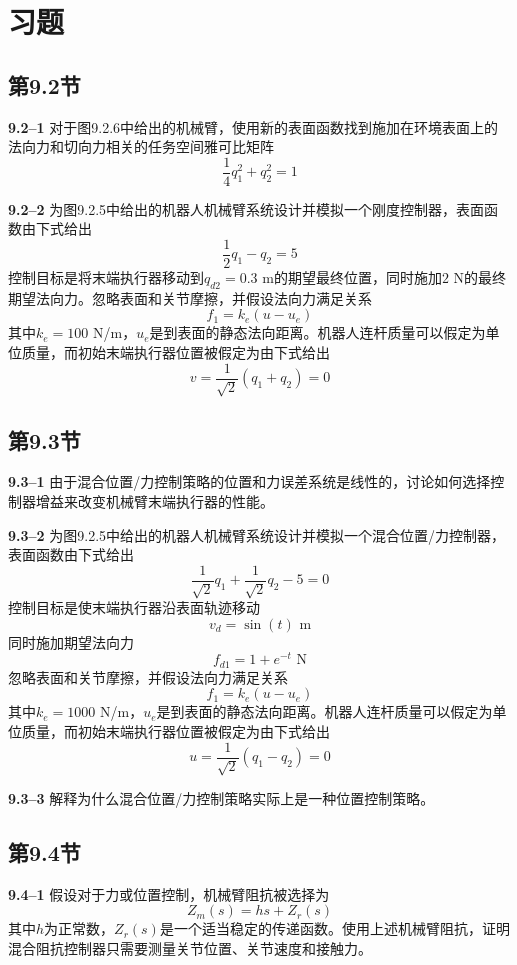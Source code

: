 \documentclass[12pt,a4paper]{ctexart}
\begin{document}
\section*{习题}

\subsection*{第9.2节}

\textbf{9.2--1} 对于图9.2.6中给出的机械臂，使用新的表面函数找到施加在环境表面上的法向力和切向力相关的任务空间雅可比矩阵
\[
\frac{1}{4}q_1^2 + q_2^2 = 1
\]

\textbf{9.2--2} 为图9.2.5中给出的机器人机械臂系统设计并模拟一个刚度控制器，表面函数由下式给出
\[
\frac{1}{2}q_1 - q_2 = 5
\]
控制目标是将末端执行器移动到$q_{d2} = 0.3$ m的期望最终位置，同时施加$2$ N的最终期望法向力。忽略表面和关节摩擦，并假设法向力满足关系
\[
f_1 = k_e(u - u_e)
\]
其中$k_e = 100$ N/m，$u_e$是到表面的静态法向距离。机器人连杆质量可以假定为单位质量，而初始末端执行器位置被假定为由下式给出
\[
v = \frac{1}{\sqrt{2}}(q_1 + q_2) = 0
\]

\subsection*{第9.3节}

\textbf{9.3--1} 由于混合位置/力控制策略的位置和力误差系统是线性的，讨论如何选择控制器增益来改变机械臂末端执行器的性能。

\textbf{9.3--2} 为图9.2.5中给出的机器人机械臂系统设计并模拟一个混合位置/力控制器，表面函数由下式给出
\[
\frac{1}{\sqrt{2}}q_1 + \frac{1}{\sqrt{2}}q_2 - 5 = 0
\]
控制目标是使末端执行器沿表面轨迹移动
\[
v_d = \sin(t) \text{ m}
\]
同时施加期望法向力
\[
f_{d1} = 1 + e^{-t} \text{ N}
\]
忽略表面和关节摩擦，并假设法向力满足关系
\[
f_1 = k_e(u - u_e)
\]
其中$k_e = 1000$ N/m，$u_e$是到表面的静态法向距离。机器人连杆质量可以假定为单位质量，而初始末端执行器位置被假定为由下式给出
\[
u = \frac{1}{\sqrt{2}}(q_1 - q_2) = 0
\]

\textbf{9.3--3} 解释为什么混合位置/力控制策略实际上是一种位置控制策略。

\subsection*{第9.4节}

\textbf{9.4--1} 假设对于力或位置控制，机械臂阻抗被选择为
\[
Z_m(s) = hs + Z_r(s)
\]
其中$h$为正常数，$Z_r(s)$是一个适当稳定的传递函数。使用上述机械臂阻抗，证明混合阻抗控制器只需要测量关节位置、关节速度和接触力。
\end{document}
